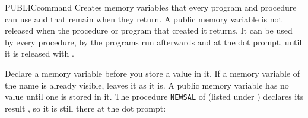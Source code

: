\begin{XbaseEntry}{PUBLIC}{command}
Creates memory variables that every program and procedure can use and that
remain when they return.
\Syntax
{}
\Usage
A public memory variable is not released when the procedure or program that
created it returns.  It can be used by every procedure, by the programs run
afterwards and at the dot prompt, until it is released with .

Declare a memory variable  before you store a value in it.  If a
memory variable of the name is already visible,  leaves it as it
is.  A public memory variable has no value until one is stored in it.
\Examples
The procedure \texttt{NEWSAL} of  (listed under )
declares its result , so it is still there at the dot prompt:
\end{XbaseEntry}

